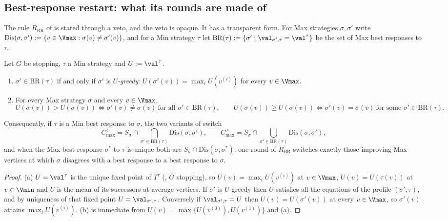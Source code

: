 
\subsection{Best-response restart: what its rounds are made of}

The rule $R_{\mathrm{BR}}$ of  is stated through a veto, and
the veto is opaque.  It has a transparent form.  For Max strategies
$\sigma,\sigma'$ write $\mathrm{Dis}(\sigma,\sigma'):=\{v\in\Vmax:\sigma(v)\ne\sigma'(v)\}$,
and for a Min strategy $\tau$ let
$\mathrm{BR}(\tau):=\{\sigma':\val_{\sigma',\tau}=\val^{\tau}\}$ be the set of
Max best responses to $\tau$.

\begin{lemma}\label{bsc:double-br}
Let $G$ be stopping, $\tau$ a Min strategy and $U:=\val^{\tau}$.
\begin{enumerate}
\item[(a)] $\sigma'\in\mathrm{BR}(\tau)$ if and only if $\sigma'$ is
  \emph{$U$-greedy}: $U(\sigma'(v))=\max_iU(v^{(i)})$ for every $v\in\Vmax$.
\item[(b)] For every Max strategy $\sigma$ and every $v\in\Vmax$,
\[
  U(\bar\sigma(v))>U(\sigma(v))\iff \sigma'(v)\ne\sigma(v)\ \text{for all }
  \sigma'\in\mathrm{BR}(\tau),\qquad
  U(\bar\sigma(v))\ge U(\sigma(v))\iff \sigma'(v)=\bar\sigma(v)\ \text{for some }
  \sigma'\in\mathrm{BR}(\tau).
\]
\end{enumerate}
Consequently, if $\tau$ is a Min best response to $\sigma$, the two variants of
 switch
\[
  C^{>}_{\max}=S_\sigma\cap\!\!\bigcap_{\sigma'\in\mathrm{BR}(\tau)}\!\!\mathrm{Dis}(\sigma,\sigma'),
  \qquad
  C^{\ge}_{\max}=S_\sigma\cap\!\!\bigcup_{\sigma'\in\mathrm{BR}(\tau)}\!\!\mathrm{Dis}(\sigma,\sigma'),
\]
and when the Max best response $\sigma^{\ast}$ to $\tau$ is unique both are
$S_\sigma\cap\mathrm{Dis}(\sigma,\sigma^{\ast})$: one round of $R_{\mathrm{BR}}$
switches exactly those improving Max vertices at which $\sigma$ disagrees with
a best response to a best response to $\sigma$.
\end{lemma}

\begin{proof}
(a) $U=\val^{\tau}$ is the unique fixed point of $T^{\tau}$
(, $G$ stopping), so $U(v)=\max_iU(v^{(i)})$ at
$v\in\Vmax$, $U(v)=U(\tau(v))$ at $v\in\Vmin$ and $U$ is the mean of its
successors at average vertices.  If $\sigma'$ is $U$-greedy then $U$ satisfies
all the equations of the profile $(\sigma',\tau)$, and by uniqueness of that
fixed point $U=\val_{\sigma',\tau}$.  Conversely if $\val_{\sigma',\tau}=U$
then $U(v)=U(\sigma'(v))$ at every $v\in\Vmax$, so $\sigma'(v)$ attains
$\max_iU(v^{(i)})$.  (b) is immediate from
$U(v)=\max\{U(v^{(0)}),U(v^{(1)})\}$ and (a).
\end{proof}

